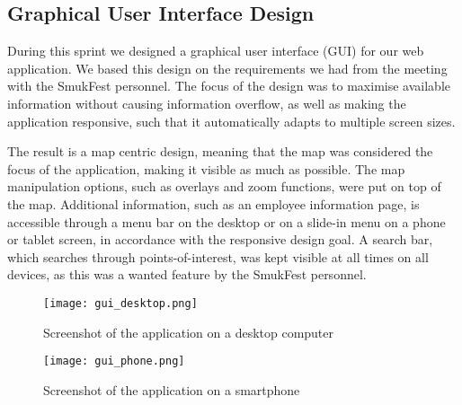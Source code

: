 \subsection{Graphical User Interface Design} \label{sec:s2_gui}

During this sprint we designed a graphical user interface (GUI) for our web application. We based this design on the requirements we had from the meeting with the SmukFest personnel. The focus of the design was to maximise available information without causing information overflow, as well as making the application responsive, such that it automatically adapts to multiple screen sizes. 

The result is a map centric design, meaning that the map was considered the focus of the application, making it visible as much as possible. The map manipulation options, such as overlays and zoom functions, were put on top of the map. Additional information, such as an employee information page, is accessible through a menu bar on the desktop or on a slide-in menu on a phone or tablet screen, in accordance with the responsive design goal. A search bar, which searches through points-of-interest, was kept visible at all times on all devices, as this was a wanted feature by the SmukFest personnel.

\begin{figure}
    \centering
\texttt{[image: gui\_desktop.png]}
\caption{Screenshot of the application on a desktop computer}
\label{desktopscreenshot}
\end{figure}

\begin{figure}
    \centering
\texttt{[image: gui\_phone.png]}
\caption{Screenshot of the application on a smartphone}
\label{phonescreenshot}
\end{figure}

